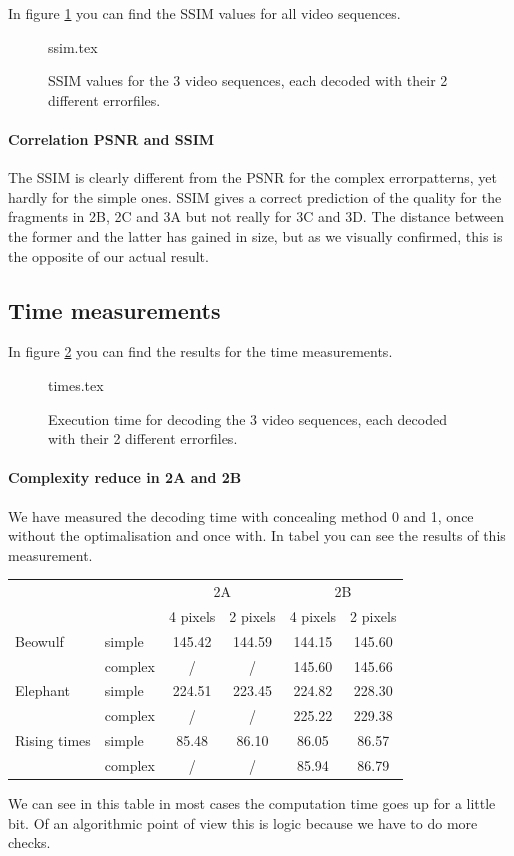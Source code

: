 \documentclass[a4paper,11pt,oneside]{article}
\begin{document}
\par In figure \ref{fig:SSIM} you can find the SSIM values for all video sequences.
\begin{figure}[H]
{ssim.tex}
\caption{SSIM values for the 3 video sequences, each decoded with their 2 different errorfiles.}
\label{fig:SSIM}
\end{figure}
\paragraph{Correlation PSNR and SSIM}
\vspace{-0.5cm}
The SSIM is clearly different from the PSNR for the complex errorpatterns, yet hardly for the simple ones. SSIM gives a correct prediction of the quality for the fragments in 2B, 2C and 3A but not really for 3C and 3D. The distance between the former and the latter has gained in size, but as we visually confirmed, this is the opposite of our actual result.

\subsection{Time measurements}
\vspace{-0.5cm}
In figure \ref{fig:time} you can find the results for the time measurements.
\begin{figure}[H]
{times.tex}
\caption{Execution time for decoding the 3 video sequences, each decoded with their 2 different errorfiles.}
\label{fig:time}
\end{figure}

\paragraph{Complexity reduce in 2A and 2B}
We have measured the decoding time with concealing method 0 and 1, once without the optimalisation and once with. In tabel you can see the results of this measurement.
\vspace{-0.5cm}
\begin{center}
\begin{tabular}{ll||c|c||c|c}
&&\multicolumn{2}{c}{2A}& \multicolumn{2}{c}{2B}\\\cline{3-6}
&& 4 pixels & 2 pixels & 4 pixels & 2 pixels\\
\hline
Beowulf & simple & 145.42 & 144.59 & 144.15 & 145.60\\
&complex &/ &/ & 145.60 & 145.66\\
\hline
Elephant & simple & 224.51 & 223.45 & 224.82& 228.30\\
&complex & / &/ & 225.22 & 229.38\\
\hline
Rising times & simple & 85.48 & 86.10 & 86.05& 86.57\\
&complex & / &/ & 85.94 & 86.79\\
\end{tabular}
\end{center}
\vspace{-0.5cm}
We can see in this table in most cases the computation time goes up for a little bit. Of an algorithmic point of view this is logic because we have to do more checks.
\end{document}
